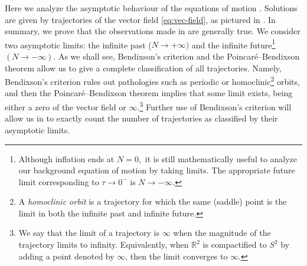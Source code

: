 Here we analyze the asymptotic behaviour of the equations of motion . Solutions are given by trajectories of the vector field \eqref{eq:vec-field}, as pictured in . In summary, we prove that the observations made in  are generally true. We consider two asymptotic limits: the infinite past ($N\to+\infty)$ and the infinite future\footnote{Although inflation ends at $N=0,$ it is still mathematically useful to analyze our background equation of motion by taking limits. The appropriate future limit corresponding to $\tau\to0^{-}$ is $N\to-\infty$. } $(N\to-\infty)$. As we shall see, Bendixson's criterion and the Poincar\'e--Bendixson theorem \cite{bendixson1901} allow us to give a complete classification of all trajectories. Namely, Bendixson's criterion rules out pathologies such as periodic or homoclinic\footnote{A \emph{homoclinic orbit} is a trajectory for which the same (saddle) point is the limit in both the infinite past and infinite future.} orbits, and then the Poincar\'e--Bendixson theorem implies that some limit exists, being either a zero of the vector field or $\bm{\infty}$.\footnote{We say that the limit of a trajectory is $\bm{\infty}$ when the magnitude of the trajectory limits to infinity. Equivalently, when $\mathbb{R}^{2}$ is compactified to $S^{2}$ by adding a point denoted by $\bm{\infty}$, then the limit converges to $\bm{\infty}$. } Further use of Bendixson's criterion will allow us in  to exactly count the number of trajectories as classified by their asymptotic limits.


